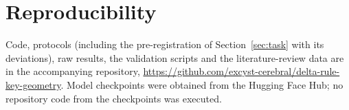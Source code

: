 \documentclass{article}
\begin{document}
\section*{Reproducibility}
Code, protocols (including the pre-registration of Section~\ref{sec:task} with its deviations), raw results, the validation scripts and the literature-review data are in the accompanying repository, \url{https://github.com/excyst-cerebral/delta-rule-key-geometry}. Model checkpoints were obtained from the Hugging Face Hub; no repository code from the checkpoints was executed.




\appendix

\end{document}
